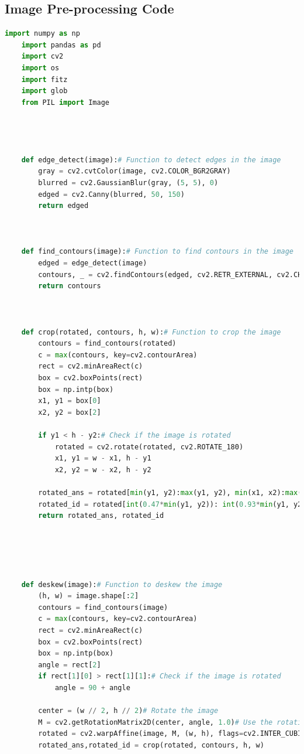 \documentclass[twocolumn]{article}
\begin{document}
\subsection{Image Pre-processing Code}
\begin{lstlisting}[language=Python, caption=crop\_pdf\_input.py]
    import numpy as np
    import pandas as pd
    import cv2
    import os
    import fitz
    import glob
    from PIL import Image
    
    
    
    
    def edge_detect(image):# Function to detect edges in the image
        gray = cv2.cvtColor(image, cv2.COLOR_BGR2GRAY)
        blurred = cv2.GaussianBlur(gray, (5, 5), 0)
        edged = cv2.Canny(blurred, 50, 150)
        return edged
    
    
    
    def find_contours(image):# Function to find contours in the image
        edged = edge_detect(image)
        contours, _ = cv2.findContours(edged, cv2.RETR_EXTERNAL, cv2.CHAIN_APPROX_SIMPLE)
        return contours
    
    
    
    def crop(rotated, contours, h, w):# Function to crop the image
        contours = find_contours(rotated)
        c = max(contours, key=cv2.contourArea)
        rect = cv2.minAreaRect(c)
        box = cv2.boxPoints(rect)
        box = np.intp(box)
        x1, y1 = box[0]
        x2, y2 = box[2]
    
        if y1 < h - y2:# Check if the image is rotated
            rotated = cv2.rotate(rotated, cv2.ROTATE_180)
            x1, y1 = w - x1, h - y1
            x2, y2 = w - x2, h - y2
    
        rotated_ans = rotated[min(y1, y2):max(y1, y2), min(x1, x2):max(x1, x2)]
        rotated_id = rotated[int(0.47*min(y1, y2)): int(0.93*min(y1, y2)),int(0.76*max(x1, x2)):int(0.99*max(x1, x2))]
        return rotated_ans, rotated_id
    
    
    
    
    
    def deskew(image):# Function to deskew the image
        (h, w) = image.shape[:2]
        contours = find_contours(image)
        c = max(contours, key=cv2.contourArea)
        rect = cv2.minAreaRect(c)
        box = cv2.boxPoints(rect)
        box = np.intp(box)
        angle = rect[2]
        if rect[1][0] > rect[1][1]:# Check if the image is rotated
            angle = 90 + angle
    
        center = (w // 2, h // 2)# Rotate the image
        M = cv2.getRotationMatrix2D(center, angle, 1.0)# Use the rotation matrix to rotate the image
        rotated = cv2.warpAffine(image, M, (w, h), flags=cv2.INTER_CUBIC, borderMode=cv2.BORDER_REPLICATE)
        rotated_ans,rotated_id = crop(rotated, contours, h, w)
    

\end{lstlisting}
\end{document}
